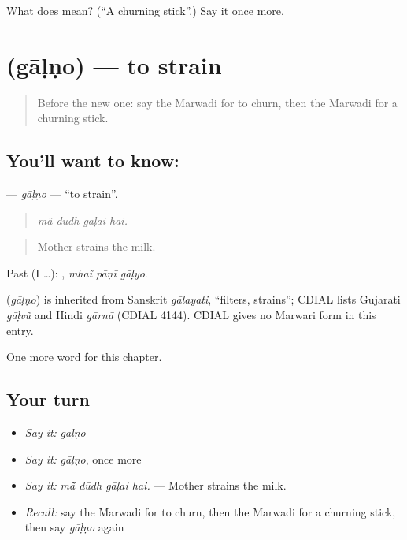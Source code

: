 \begin{tcolorbox}[breakable,colback=teal!4,colframe=teal!35!black,title={Before you move on}]
What does  mean? (\textquotedblleft{}A churning stick\textquotedblright{}.) Say it once more.
\end{tcolorbox}
\section[\texorpdfstring{\mw{गाळणो} (gāḷṇo)}{गाळणो (gāḷṇo)}]{ (gāḷṇo) — to strain}

\label{lesson:MW-C181-galno}



\begin{quote}
Before the new one: say the Marwadi for to churn, then the Marwadi for a churning stick.
\end{quote}

\subsection*{You'll want to know: }
\textbf{} — \emph{gāḷṇo} — \textquotedblleft{}to strain\textquotedblright{}.

\begin{quote}
   
\end{quote}

\begin{quote}
\emph{mā̃ dūdh gāḷai hai.}
\end{quote}

\begin{quote}
Mother strains the milk.
\end{quote}

Past (I …):   , \emph{mhaĩ pāṇī gāḷyo}.

\begin{cousinweb}
\textbf{} (\emph{gāḷṇo}) is inherited from Sanskrit \emph{gālayati}, \textquotedblleft{}filters, strains\textquotedblright{}; CDIAL lists Gujarati \emph{gāḷvũ} and Hindi \emph{gārnā} (CDIAL 4144). CDIAL gives no Marwari form in this entry.
\end{cousinweb}

\begin{grammarlens}[title={What you've built}]
One more word for this chapter.
\end{grammarlens}

\subsection*{Your turn}
\begin{itemize}
\raggedright
  \item \emph{Say it:} \emph{gāḷṇo}
  \item \emph{Say it:} \emph{gāḷṇo}, once more
  \item \emph{Say it:} \emph{mā̃ dūdh gāḷai hai.} — Mother strains the milk.
  \item \emph{Recall:} say the Marwadi for to churn, then the Marwadi for a churning stick, then say \emph{gāḷṇo} again
\end{itemize}

